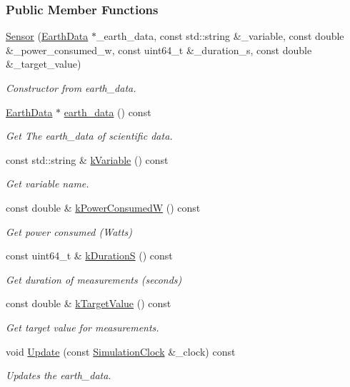 \subsubsection*{Public Member Functions}
\begin{DoxyCompactItemize}
\item 
\hyperlink{classosse_1_1collaborate_1_1_sensor_a54618610f28a522fa48dd43ea4cdac9a}{Sensor} (\hyperlink{classosse_1_1collaborate_1_1_earth_data}{Earth\+Data} $\ast$\+\_\+earth\+\_\+data, const std\+::string \&\+\_\+variable, const double \&\+\_\+power\+\_\+consumed\+\_\+w, const uint64\+\_\+t \&\+\_\+duration\+\_\+s, const double \&\+\_\+target\+\_\+value)
\begin{DoxyCompactList}\small\item\em Constructor from earth\+\_\+data. \end{DoxyCompactList}\item 
\hyperlink{classosse_1_1collaborate_1_1_earth_data}{Earth\+Data} $\ast$ \hyperlink{classosse_1_1collaborate_1_1_sensor_a60ed2a55579dc999d9d4a40b4e2d2473}{earth\+\_\+data} () const
\begin{DoxyCompactList}\small\item\em Get The earth\+\_\+data of scientific data. \end{DoxyCompactList}\item 
const std\+::string \& \hyperlink{classosse_1_1collaborate_1_1_sensor_a06cf8b42c998b5125fcaef972f1950fd}{k\+Variable} () const
\begin{DoxyCompactList}\small\item\em Get variable name. \end{DoxyCompactList}\item 
const double \& \hyperlink{classosse_1_1collaborate_1_1_sensor_add78370d01a8feb5d1027a791906b691}{k\+Power\+ConsumedW} () const
\begin{DoxyCompactList}\small\item\em Get power consumed (Watts) \end{DoxyCompactList}\item 
const uint64\+\_\+t \& \hyperlink{classosse_1_1collaborate_1_1_sensor_a79da44f371358582b3ab820db6069614}{k\+DurationS} () const
\begin{DoxyCompactList}\small\item\em Get duration of measurements (seconds) \end{DoxyCompactList}\item 
const double \& \hyperlink{classosse_1_1collaborate_1_1_sensor_ae19c635fce562849ee3d1e7883bee22c}{k\+Target\+Value} () const
\begin{DoxyCompactList}\small\item\em Get target value for measurements. \end{DoxyCompactList}\item 
void \hyperlink{classosse_1_1collaborate_1_1_sensor_a58a36b29c3872dffecfe386610d45095}{Update} (const \hyperlink{classosse_1_1collaborate_1_1_simulation_clock}{Simulation\+Clock} \&\+\_\+clock) const
\begin{DoxyCompactList}\small\item\em Updates the earth\+\_\+data. \end{DoxyCompactList}\end{DoxyCompactItemize}
